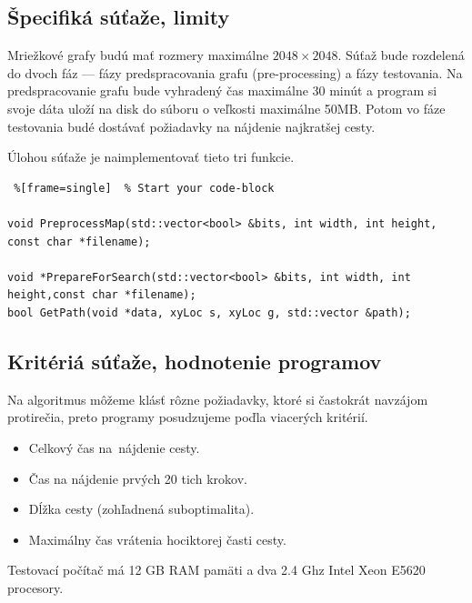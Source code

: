 \subsection{Špecifiká súťaže, limity}

Mriežkové grafy budú mať rozmery maximálne $2048 \times 2048$.
Súťaž bude rozdelená do dvoch fáz --- fázy predspracovania grafu (pre-processing)
a fázy testovania. Na predspracovanie grafu bude vyhradený čas
maximálne 30 minút a program si svoje dáta uloží na disk do súboru o veľkosti maximálne 50MB.
Potom vo fáze testovania budé dostávať požiadavky na nájdenie najkratšej cesty.

Úlohou súťaže je naimplementovať tieto tri funkcie.

\lstset{language=C++}          %

\begin{lstlisting} %[frame=single]  % Start your code-block

void PreprocessMap(std::vector<bool> &bits, int width, int height, const char *filename);
                   
void *PrepareForSearch(std::vector<bool> &bits, int width, int height,const char *filename);
bool GetPath(void *data, xyLoc s, xyLoc g, std::vector &path);
\end{lstlisting}

\subsection{Kritériá súťaže, hodnotenie programov}
Na algoritmus môžeme klásť rôzne požiadavky, ktoré si častokrát navzájom protirečia, preto programy posudzujeme poďla viacerých kritérií.

\begin{itemize}
\item Celkový čas na~nájdenie cesty.
\item Čas na nájdenie prvých 20 tich krokov.
\item Dĺžka cesty (zohľadnená suboptimalita).
\item Maximálny čas vrátenia hociktorej časti cesty.
\end{itemize}

Testovací počítač má 12 GB RAM pamäti a dva 2.4 Ghz Intel Xeon E5620
procesory.